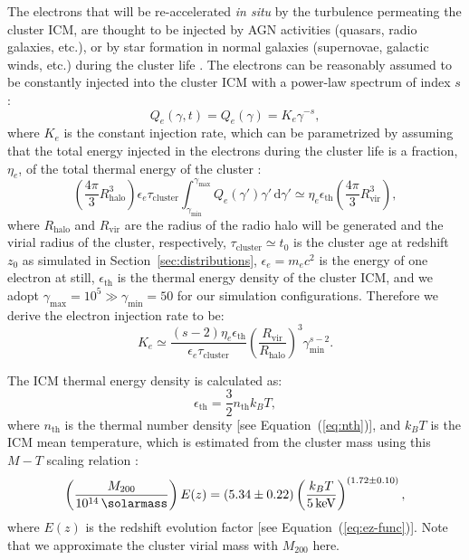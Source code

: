 \documentclass[modern]{aastex61}
\newcommand{\R}[1]{\mathrm{#1}}
\newcommand{\D}[1]{\R{d} #1}
\begin{document}
The electrons that will be re-accelerated \emph{in situ}
by the turbulence permeating the cluster ICM, are thought to be
injected by AGN activities (quasars, radio galaxies, etc.), or by
star formation in normal galaxies (supernovae, galactic winds, etc.)
during the cluster life \citep[see][for a review]{blasi2007rev}.
The electrons can be reasonably assumed to be constantly injected
into the cluster ICM with a power-law spectrum of index $s$
\citep{cassano2005,sarazin1999}:
\begin{equation}
  \label{eq:electron-inj}
  Q_e(\gamma, t) = Q_e(\gamma) = K_e \gamma^{-s},
\end{equation}
where $K_e$ is the constant injection rate, which can be parametrized
by assuming that the total energy injected in the electrons during
the cluster life is a fraction, $\eta_e$, of the total thermal energy
of the cluster \citep{cassano2005}:
\begin{equation}
  \label{eq:injrate-param}
  \left( \frac{4\pi}{3} R_{\R{halo}}^3 \right) \epsilon_e \tau_{\R{cluster}}
  \int_{\gamma_{\R{min}}}^{\gamma_{\R{max}}}
  Q_e(\gamma') \gamma' \,\D{\gamma'} \simeq
  \eta_e \epsilon_{\R{th}} \left( \frac{4\pi}{3} R_{\R{vir}}^3 \right),
\end{equation}
where $R_{\R{halo}}$ and $R_{\R{vir}}$ are the radius of the radio halo
will be generated and the virial radius of the cluster, respectively,
$\tau_{\R{cluster}} \simeq t_0$ is the cluster age at redshift $z_0$ as
simulated in Section~\ref{sec:distributions},
$\epsilon_e = m_e c^2$ is the energy of one electron at still,
$\epsilon_{\R{th}}$ is the thermal energy density of the cluster ICM,
and we adopt $\gamma_{\R{max}} = 10^5 \gg \gamma_{\R{\min}} = 50$
for our simulation configurations.
Therefore we derive the electron injection rate to be:
\begin{equation}
  \label{eq:injrate}
  K_e \simeq \frac{(s-2)\eta_e\epsilon_{\R{th}}}{\epsilon_e\tau_{\R{cluster}}}
  \left( \frac{R_{\R{vir}}}{R_{\R{halo}}} \right)^3 \gamma_{\R{min}}^{s-2}.
\end{equation}

The ICM thermal energy density is calculated as:
\begin{equation}
  \label{eq:eth}
  \epsilon_{\R{th}} = \frac{3}{2} n_{\R{th}} k_B T,
\end{equation}
where $n_{\R{th}}$ is the thermal number density [see Equation~(\ref{eq:nth})],
and $k_B T$ is the ICM mean temperature, which is estimated
from the cluster mass using this $M \!-\! T$ scaling relation
\citep{arnaud2005}:
\begin{equation}
  \label{eq:mt-relation}
  \left( \frac{M_{200}}{\SI{e14}{\solarmass}} \right) E(z) = (5.34 \pm 0.22)
  \left( \frac{k_B T}{\SI{5}{\keV}} \right)^{(1.72 \pm 0.10)},
\end{equation}
where $E(z)$ is the redshift evolution factor [see Equation~(\ref{eq:ez-func})].
Note that we approximate the cluster virial mass with $M_{200}$ here.
\end{document}
